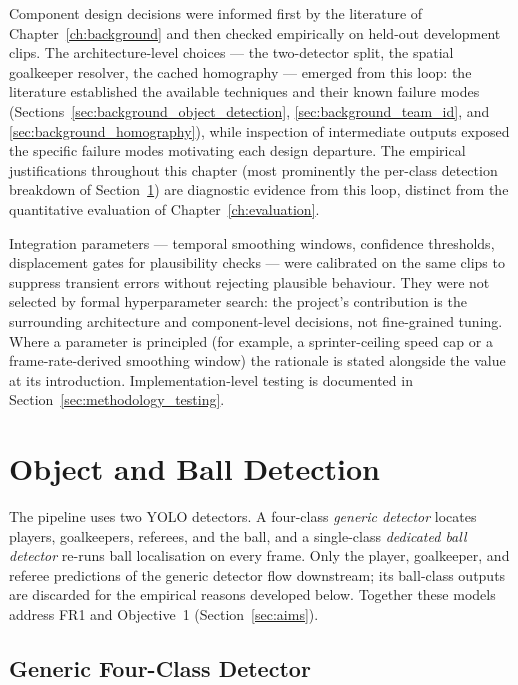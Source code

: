 Component design decisions were informed first by the literature of
Chapter~\ref{ch:background} and then checked empirically on held-out
development clips. The architecture-level choices --- the two-detector split,
the spatial goalkeeper resolver, the cached homography --- emerged from this
loop: the literature established the available techniques and their known
failure modes (Sections~\ref{sec:background_object_detection},
\ref{sec:background_team_id}, and \ref{sec:background_homography}), while
inspection of intermediate outputs exposed the specific failure modes
motivating each design departure. The empirical justifications throughout
this chapter (most prominently the per-class detection breakdown of
Section~\ref{sec:methodology_detection}) are diagnostic evidence from this
loop, distinct from the quantitative evaluation of
Chapter~\ref{ch:evaluation}.

Integration parameters --- temporal smoothing windows, confidence thresholds,
displacement gates for plausibility checks --- were calibrated on the same
clips to suppress transient errors without rejecting plausible behaviour.
They were not selected by formal hyperparameter search: the project's
contribution is the surrounding architecture and component-level decisions,
not fine-grained tuning. Where a parameter is principled (for example, a
sprinter-ceiling speed cap or a frame-rate-derived smoothing window) the
rationale is stated alongside the value at its introduction.
Implementation-level testing is documented in
Section~\ref{sec:methodology_testing}.

\section{Object and Ball Detection}
\label{sec:methodology_detection}

The pipeline uses two YOLO detectors. A four-class \emph{generic detector}
locates players, goalkeepers, referees, and the ball, and a single-class
\emph{dedicated ball detector} re-runs ball localisation on every frame.
Only the player, goalkeeper, and referee predictions of the generic detector
flow downstream; its ball-class outputs are discarded for the empirical
reasons developed below. Together these models address FR1 and Objective~1
(Section~\ref{sec:aims}).

\subsection{Generic Four-Class Detector}
\label{subsec:methodology_main_detector}

